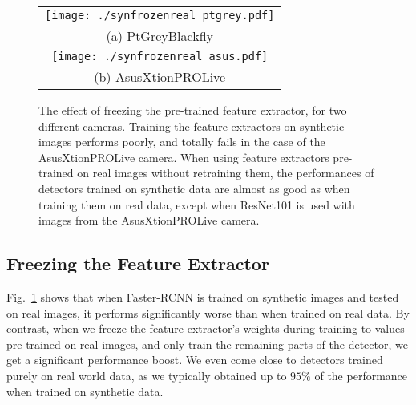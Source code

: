 \documentclass[10pt,twocolumn,letterpaper]{article}
\newcommand{\asus}[0]{AsusXtionPROLive\xspace}
\newcommand{\ptgrey}[0]{PtGreyBlackfly\xspace}
\begin{document}
\begin{figure}
\begin{center}
\begin{tabular}{c}
\texttt{[image: ./synfrozenreal\_ptgrey.pdf]} \\
(a) \ptgrey \\
\texttt{[image: ./synfrozenreal\_asus.pdf]} \\
(b) \asus \\
\end{tabular}
\end{center}
\caption{\label{fig:freezing}  The effect  of freezing  the pre-trained  feature
  extractor,  for two  different cameras.   Training the  feature extractors  on
  synthetic images  performs poorly, and totally  fails in the case  of the \asus
  camera.  When  using  feature  extractors   pre-trained  on  real  images  without
  retraining them, the performances of detectors trained on synthetic data are almost  as good as when training them on real
  data, except when ResNet101 is used with images from the \asus camera.}
\end{figure}

\subsection{Freezing the Feature Extractor}
\label{subsec:freezing}

Fig.~\ref{fig:freezing}  shows that  when  Faster-RCNN is  trained on  synthetic
images and  tested on  real images,  it performs  significantly worse  than when
trained  on real  data.  By contrast,  when we  freeze  the feature  extractor's
weights during training to values pre-trained on real images, and only train the
remaining parts  of the detector,  we get  a significant performance  boost.  We
even come close to detectors trained purely  on real world data, as we typically
obtained up to $95\%$ of the performance when trained on synthetic data.
\end{document}
